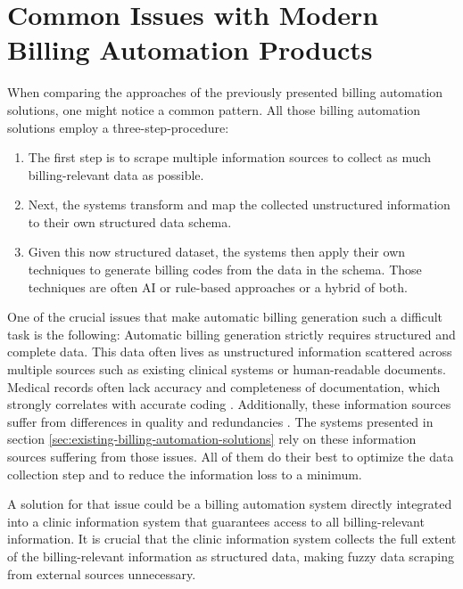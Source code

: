 \section{Common Issues with Modern Billing Automation Products}\label{sec:common-issues-with-modern-billing-automation-products}
When comparing the approaches of the previously presented billing automation solutions, one might notice a common pattern.
All those billing automation solutions employ a three-step-procedure:
\begin{enumerate}
    \item The first step is to scrape multiple information sources to collect as much billing-relevant data as possible.
    \item Next, the systems transform and map the collected unstructured information to their own structured data schema.
    \item Given this now structured dataset, the systems then apply their own techniques to generate billing codes from the data in the schema.
    Those techniques are often AI or rule-based approaches or a hybrid of both.
\end{enumerate}

One of the crucial issues that make automatic billing generation such a difficult task is the following:
Automatic billing generation strictly requires structured and complete data.
This data often lives as unstructured information scattered across multiple sources such as existing clinical systems or human-readable documents.
Medical records often lack accuracy and completeness of documentation, which strongly correlates with accurate coding \cite{Farhan2005Documentation}.
Additionally, these information sources suffer from differences in quality and redundancies \cite{Scheurwegs2017Selecting}.
The systems presented in section \ref{sec:existing-billing-automation-solutions} rely on these information sources suffering from those issues.
All of them do their best to optimize the data collection step and to reduce the information loss to a minimum.

A solution for that issue could be a billing automation system directly integrated into a clinic information system that guarantees access to all billing-relevant information.
It is crucial that the clinic information system collects the full extent of the billing-relevant information as structured data, making fuzzy data scraping from external sources unnecessary.

